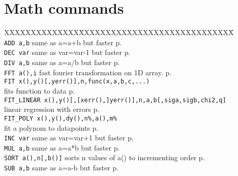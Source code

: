 \section{Math commands}
\begin{tabbing}
XXXXXXXXXXXXXX\=XXXXXXXXXXXXXXXXXXXXXXXXXXXXX\=\kill\\
\verb|ADD a,b| 		\> same as a=a+b but faster\> p.\pageref{ADD}\\
\verb|DEC var| 		\> same as var=var-1 but faster\> p.\pageref{DEC}\\
\verb|DIV a,b| 		\> same as a=a/b but faster\> p.\pageref{DIV}\\
\verb|FFT a(),i|	\>fast fourier transformation on 1D array.\> p.\pageref{FFT}\\
\verb|FIT x(),y()[,yerr()],n,func(x,a,b,c,...)| \> \\
			\> fits function to data\> p.\pageref{FIT}\\
\verb|FIT_LINEAR x(),y()[,[xerr(),]yerr()],n,a,b[,siga,sigb,chi2,q]|\> \\
			\> linear regression with errors\> p.\pageref{FITiLINEAR}\\
\verb|FIT_POLY x(),y(),dy(),n%,a(),m%|\> \\
			\> fit a polynom to datapoints\> p.\pageref{FITiPOLY}\\
\verb|INC var| 		\> same as var=var+1 but faster\> p.\pageref{INC}\\
\verb|MUL a,b| 		\> same as a=a*b but faster\> p.\pageref{MUL}\\
\verb|SORT a(),n[,b()]|	\> sorts n values of a() to incrementing order\> p.\pageref{SORT}\\
\verb|SUB a,b|		\> same as a=a-b but faster\> p.\pageref{SUB}\\
\end{tabbing}



